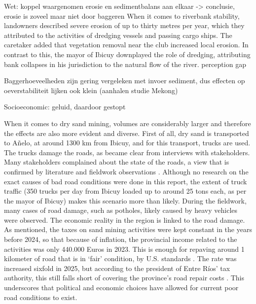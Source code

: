 Wet:
koppel waargenomen erosie en sedimentbalans aan elkaar -> conclusie, erosie is zoveel maar niet door baggeren
When it comes to riverbank stability, landowners described severe erosion of up to thirty metres per year, which they attributed to the activities of dredging vessels and passing cargo ships. The caretaker added that vegetation removal near the club increased local erosion. In contrast to this, the mayor of Ibicuy downplayed the role of dredging, attributing bank collapses in his jurisdiction to the natural flow of the river.
perception gap

Baggerhoeveelheden zijn gering vergeleken met invoer sediment, dus effecten op oeverstabiliteit lijken ook klein (aanhalen studie Mekong)

Socioeconomic: geluid, daardoor gestopt


When it comes to dry sand mining, volumes are considerably larger and therefore the effects are also more evident and diverse. First of all, dry sand is transported to Añelo, at around 1300 km from Ibicuy, and for this transport, trucks are used. The trucks damage the roads, as became clear from interviews with stakeholders. Many stakeholders complained about the state of the roads, a view that is confirmed by literature and fieldwork observations \autocite{fogliaSedArena2023} \autocite{novasImpactoAmbientalOculto2022}. Although no research on the exact causes of bad road conditions were done in this report, the extent of truck traffic (350 trucks per day from Ibicuy loaded up to around 25 tons each, as per the mayor of Ibicuy) makes this scenario more than likely. During the fieldwork, many cases of road damage, such as potholes, likely caused by heavy vehicles were observed. The economic reality in the region is linked to the road damage. As mentioned, the taxes on sand mining activities were kept constant in the years before 2024, so that because of inflation, the provincial income related to the activities was only 440.000 Euros in 2023. This is enough for repaving around 1 kilometer of road that is in `fair' condition, by U.S. standards \autocite{crumbCostRoadMaintenance2024}. The rate was increased sixfold in 2025, but according to the president of Entre Ríos’ tax authority, this still falls short of covering the province’s road repair costs \autocite{bellatoEntreRiosFrigerio2025}. This underscores that political and economic choices have allowed for current poor road conditions to exist.

